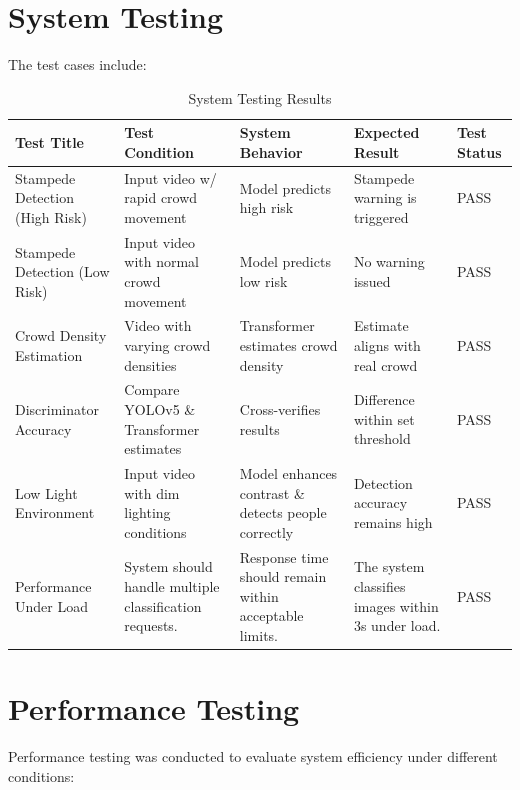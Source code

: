 \documentclass[11pt]{report}
\begin{document}
\section{System Testing}
The test cases include:
\begin{table}[H]
    \centering
    \renewcommand{\arraystretch}{1.4}
    \setlength{\tabcolsep}{3pt}
    \footnotesize
    \begin{tabular}{| m{2.3cm} | m{3.2cm} | m{3.5cm} | m{3.2cm} | m{1.2cm} |}
        \hline
        \textbf{Test Title} & \textbf{Test Condition} & \textbf{System Behavior} & \textbf{Expected Result} & \textbf{Test Status} \\ 
        \hline
         Stampede Detection (High Risk)	& Input video w/ rapid crowd movement &	Model predicts high risk	& Stampede warning is triggered & PASS\\
         \hline
        Stampede Detection (Low Risk) & Input video with normal crowd movement	& Model predicts low risk	& No warning issued	& PASS\\ 
        \hline
        Crowd Density Estimation & Video with varying crowd densities	& Transformer estimates crowd density	& Estimate aligns with real crowd	& PASS\\
        \hline
        Discriminator Accuracy & Compare YOLOv5 \& Transformer estimates & Cross-verifies results & Difference within set threshold	& PASS\\
        \hline 
        Low Light Environment & Input video with dim lighting conditions	& Model enhances contrast \& detects people correctly	& Detection accuracy remains high & PASS \\
        \hline
 
        Performance Under Load & System should handle multiple classification requests. & Response time should remain within acceptable limits. & The system classifies images within 3s under load. & PASS \\ 
        \hline
    
    
    \end{tabular}
    \caption{System Testing Results}
\end{table}

\section{Performance Testing}
 Performance testing was conducted to evaluate system efficiency under different conditions:
 
\end{document}
